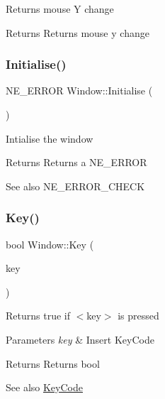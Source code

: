 Returns mouse Y change \begin{DoxyReturn}{Returns}
Returns mouse y change 
\end{DoxyReturn}
\mbox{\label{class_window_a07170e342d1296aebba4f4808ebb72a1}} 
\subsubsection{\texorpdfstring{Initialise()}{Initialise()}}
{\footnotesize\ttfamily N\+E\+\_\+\+E\+R\+R\+OR Window\+::\+Initialise (\begin{DoxyParamCaption}{ }\end{DoxyParamCaption})}

Intialise the window \begin{DoxyReturn}{Returns}
Returns a N\+E\+\_\+\+E\+R\+R\+OR 
\end{DoxyReturn}
\begin{DoxySeeAlso}{See also}
N\+E\+\_\+\+E\+R\+R\+O\+R\+\_\+\+C\+H\+E\+CK 
\end{DoxySeeAlso}
\mbox{\label{class_window_a204179a76d0a02a336fde32a1da32186}} 
\subsubsection{\texorpdfstring{Key()}{Key()}\hspace{0.1cm}{\footnotesize\ttfamily [1/2]}}
{\footnotesize\ttfamily bool Window\+::\+Key (\begin{DoxyParamCaption}\item[{\mbox{\hyperlink{class_window_a4915898e3e02586ae359c8cfb9114717}{Key\+Code}}}]{key }\end{DoxyParamCaption})}

Returns true if $<$key$>$ is pressed 
\begin{DoxyParams}{Parameters}
{\em key} & Insert Key\+Code \\
\hline
\end{DoxyParams}
\begin{DoxyReturn}{Returns}
Returns bool 
\end{DoxyReturn}
\begin{DoxySeeAlso}{See also}
\mbox{\hyperlink{class_window_a4915898e3e02586ae359c8cfb9114717}{Key\+Code}} 
\end{DoxySeeAlso}
\mbox{\label{class_window_a22723619109b05b9a6955359a4ab7267}} 
